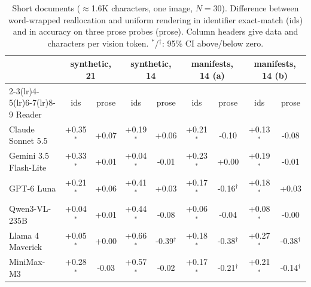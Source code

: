 \begin{table}[!htbp]
\centering\small\setlength{\tabcolsep}{4pt}
\caption{Short documents ($\approx$1.6K characters, one image, $N{=}30$). Difference between word-wrapped reallocation and uniform rendering in identifier exact-match (ids) and in accuracy on three prose probes (prose). Column headers give data and characters per vision token. $^{\ast}$/$^{\dagger}$: 95\% CI above/below zero.}
\label{tab:app_short}
\begin{tabular}{l cc cc cc cc}
\toprule
& \multicolumn{2}{c}{synthetic, 21} & \multicolumn{2}{c}{synthetic, 14} & \multicolumn{2}{c}{manifests, 14 (a)} & \multicolumn{2}{c}{manifests, 14 (b)} \\
\cmidrule(lr){2-3}\cmidrule(lr){4-5}\cmidrule(lr){6-7}\cmidrule(lr){8-9}
Reader & ids & prose & ids & prose & ids & prose & ids & prose \\
\midrule
Claude Sonnet 5.5 & +0.35$^{\ast}$ & +0.07 & +0.19$^{\ast}$ & +0.06 & +0.21$^{\ast}$ & -0.10 & +0.13$^{\ast}$ & -0.08 \\
Gemini 3.5 Flash-Lite & +0.33$^{\ast}$ & +0.01 & +0.04$^{\ast}$ & -0.01 & +0.23$^{\ast}$ & +0.00 & +0.19$^{\ast}$ & -0.01 \\
GPT-6 Luna & +0.21$^{\ast}$ & +0.06 & +0.41$^{\ast}$ & +0.03 & +0.17$^{\ast}$ & -0.16$^{\dagger}$ & +0.18$^{\ast}$ & +0.03 \\
Qwen3-VL-235B & +0.04$^{\ast}$ & +0.01 & +0.44$^{\ast}$ & -0.08 & +0.06$^{\ast}$ & -0.04 & +0.08$^{\ast}$ & -0.00 \\
Llama 4 Maverick & +0.05$^{\ast}$ & +0.00 & +0.66$^{\ast}$ & -0.39$^{\dagger}$ & +0.18$^{\ast}$ & -0.38$^{\dagger}$ & +0.27$^{\ast}$ & -0.38$^{\dagger}$ \\
MiniMax-M3 & +0.28$^{\ast}$ & -0.03 & +0.57$^{\ast}$ & -0.02 & +0.17$^{\ast}$ & -0.21$^{\dagger}$ & +0.21$^{\ast}$ & -0.14$^{\dagger}$ \\
\bottomrule
\end{tabular}
\end{table}
